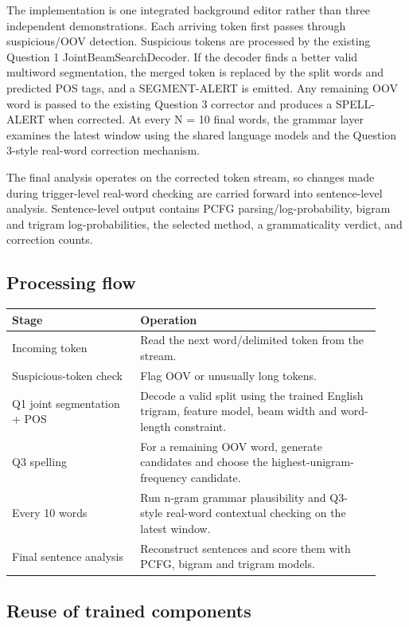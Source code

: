 \documentclass[11pt]{article}
\begin{document}
The implementation is one integrated background editor rather than three independent demonstrations. Each arriving token first passes through suspicious/OOV detection. Suspicious tokens are processed by the existing Question 1 JointBeamSearchDecoder. If the decoder finds a better valid multiword segmentation, the merged token is replaced by the split words and predicted POS tags, and a SEGMENT-ALERT is emitted. Any remaining OOV word is passed to the existing Question 3 corrector and produces a SPELL-ALERT when corrected. At every N = 10 final words, the grammar layer examines the latest window using the shared language models and the Question 3-style real-word correction mechanism.

The final analysis operates on the corrected token stream, so changes made during trigger-level real-word checking are carried forward into sentence-level analysis. Sentence-level output contains PCFG parsing/log-probability, bigram and trigram log-probabilities, the selected method, a grammaticality verdict, and correction counts.

\subsection{Processing flow}

\begin{longtable}{@{}p{0.32\linewidth}p{0.60\linewidth}@{}}
\toprule
\textbf{Stage} & \textbf{Operation} \\
\midrule
\endhead
Incoming token & Read the next word/delimited token from the stream. \\
Suspicious-token check & Flag OOV or unusually long tokens. \\
Q1 joint segmentation + POS & Decode a valid split using the trained English trigram, feature model, beam width and word-length constraint. \\
Q3 spelling & For a remaining OOV word, generate candidates and choose the highest-unigram-frequency candidate. \\
Every 10 words & Run n-gram grammar plausibility and Q3-style real-word contextual checking on the latest window. \\
Final sentence analysis & Reconstruct sentences and score them with PCFG, bigram and trigram models. \\
\bottomrule
\end{longtable}

\subsection{Reuse of trained components}
\end{document}
